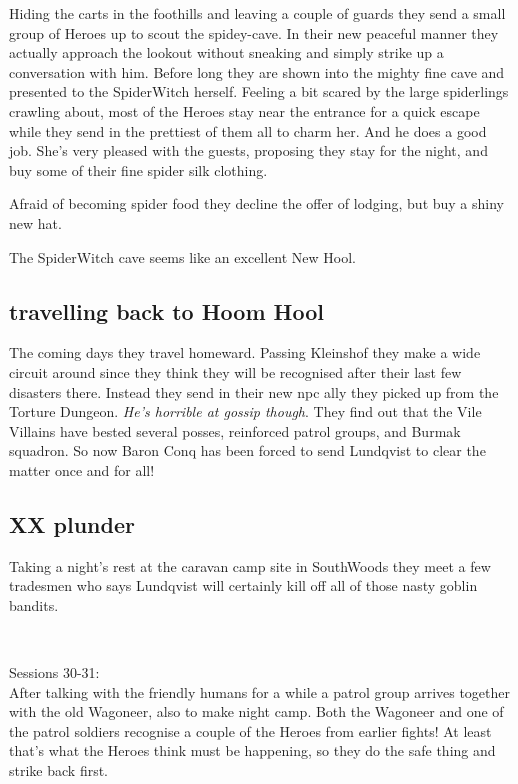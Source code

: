 Hiding the carts in the foothills and leaving a couple of guards they send a small group of Heroes up to scout the spidey-cave. In their new peaceful manner they actually approach the lookout without sneaking and simply strike up a conversation with him. Before long they are shown into the mighty fine cave and presented to the SpiderWitch herself. Feeling a bit scared by the large spiderlings crawling about, most of the Heroes stay near the entrance for a quick escape while they send in the prettiest of them all to charm her. And he does a good job. She's very pleased with the guests, proposing they stay for the night, and buy some of their fine spider silk clothing.

Afraid of becoming spider food they decline the offer of lodging, but buy a shiny new hat.

The SpiderWitch cave seems like an excellent New Hool.


\subsection*{travelling back to Hoom Hool}

The coming days they travel homeward. Passing Kleinshof they make a wide circuit around since they think they will be recognised after their last few disasters there. Instead they send in their new npc ally they picked up from the Torture Dungeon. \emph{He's horrible at gossip though}. They find out that the Vile Villains have bested several posses, reinforced patrol groups, and Burmak squadron. So now Baron Conq has been forced to send Lundqvist to clear the matter once and for all!


\subsection*{XX plunder}

Taking a night's rest at the caravan camp site in SouthWoods they meet a few tradesmen who says Lundqvist will certainly kill off all of those nasty goblin bandits.

\


Sessions 30-31:\\
After talking with the friendly humans for a while a patrol group arrives together with the old Wagoneer, also to make night camp. Both the Wagoneer and one of the patrol soldiers recognise a couple of the Heroes from earlier fights! At least that's what the Heroes think must be happening, so they do the safe thing and strike back first.


